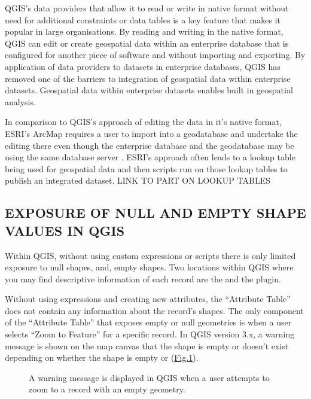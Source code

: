 \documentclass[letterpaper,11pt,english]{sphinxmanual}
\begin{document}
QGIS’s data providers that allow it to read or write in native format without need for additional constraints or data tables is a key feature that makes it popular in large organisations. By reading and writing in the native format, QGIS can edit or create geospatial data within an enterprise database that is configured for another piece of software and without importing and exporting.  By application of data providers to datasets in enterprise databases, QGIS has removed one of the barriers to integration of geospatial data within enterprise datasets.  Geospatial data within enterprise datasets enables built in geospatial analysis.

In comparison to QGIS’s approach of editing the data in it’s native format, ESRI’s ArcMap requires a user to import into a geodatabase and undertake the editing there\textendash{} even though the enterprise database and the geodatabase may be using the same database server .  ESRI’s approach often leads to a lookup table being used for geospatial data and then scripts run on those lookup tables to publish an integrated dataset.  LINK TO PART ON LOOKUP TABLES


\subsection{EXPOSURE OF NULL AND EMPTY SHAPE VALUES IN QGIS}
\label{\detokenize{concept:exposure-of-null-and-empty-shape-values-in-qgis}}
Within QGIS, without using custom expressions or scripts there is only limited exposure to null shapes, and, empty shapes.  Two locations within QGIS where you may find descriptive information of each record are the  and the  plugin.

Without using expressions and creating new attributes, the “Attribute Table” does not contain any information about the record’s shapes.  The only component of the “Attribute Table” that exposes empty or null geometries is when a user selects “Zoom to Feature” for a specific record.  In QGIS version 3.x, a warning message is shown on the map canvas that the shape is empty or doesn’t exist depending on whether the shape is empty or  (\hyperref[\detokenize{concept:figureiii}]{Fig.\@ \ref{\detokenize{concept:figureiii}}}).

\begin{figure}[htbp]
\centering
\capstart

\noindent{}
\caption{A warning message is displayed in QGIS when a user attempts to zoom to a record with an empty geometry.}\label{\detokenize{concept:id64}}\label{\detokenize{concept:figureiii}}\end{figure}
\end{document}
